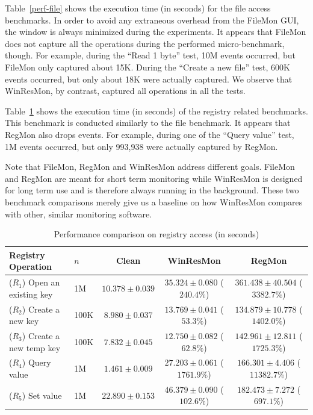 Table~\ref{perf-file} shows the execution time (in seconds) for the file
access benchmarks.  In order to avoid any extraneous overhead from the FileMon
GUI, the window is always minimized during the experiments.  It appears that
FileMon does not capture all the operations during the performed
micro-benchmark, though.  For example, during the ``Read 1 byte'' test, 10M
events occurred, but FileMon only captured about 15K.  During the ``Create a
new file'' test, 600K events occurred, but only about 18K were actually
captured.  We observe that WinResMon, by contrast, captured all
operations in all the tests.

Table~\ref{perf-reg} shows the execution time (in seconds) of the registry
related benchmarks.  This benchmark is conducted similarly to the file benchmark. 
It appears that RegMon also drops events.  For example, during one
of the ``Query value'' test, 1M events occurred, but only 993,938 were actually
captured by RegMon.

Note that FileMon, RegMon and WinResMon address different goals.
FileMon and RegMon are meant for short term monitoring while WinResMon is
designed for long term use and is therefore always running in the background.
These two benchmark comparisons merely give us a baseline on how WinResMon
compares with other, similar monitoring software.

\begin{table}
\small
\centering
\begin{tabular}{|l|l|c|c|c|}
\hline
Registry Operation & $n$ & Clean & WinResMon & RegMon \\
\hline
($R_1$) Open an existing key  & 1M   & $10.378 \pm 0.039$ & $35.324 \pm 0.080$ ($240.4\%$)  & $361.438 \pm 40.504$ ($3382.7\%$) \\
($R_2$) Create a new key      & 100K & $8.980 \pm 0.037$  & $13.769 \pm 0.041$ ($53.3\%$)   & $134.879 \pm 10.778$ ($1402.0\%$) \\
($R_3$) Create a new temp key & 100K & $7.832 \pm 0.045$  & $12.750 \pm 0.082$ ($62.8\%$)   & $142.961 \pm 12.811$ ($1725.3\%$) \\
($R_4$) Query value           & 1M   & $1.461 \pm 0.009$  & $27.203 \pm 0.061$ ($1761.9\%$) & $166.301 \pm 4.406$ ($11382.7\%$) \\
($R_5$) Set value             & 1M   & $22.890 \pm 0.153$ & $46.379 \pm 0.090$ ($102.6\%$)  & $182.473 \pm 7.272$ ($697.1\%$) \\
\hline
\end{tabular}
\caption{Performance comparison on registry access (in seconds)}
\label{perf-reg}
\end{table}

